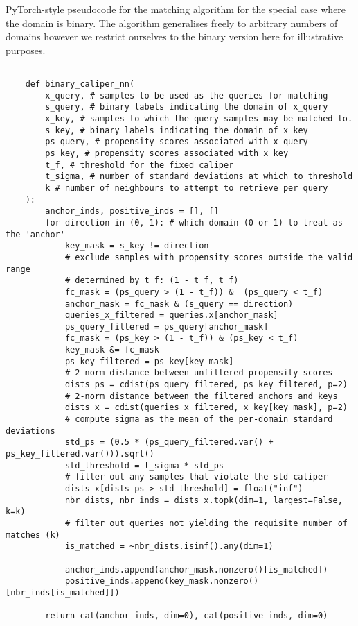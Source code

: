 \begin{algorithm}[ht]
     \caption{
         PyTorch-style pseudocode for the \CNN{} matching algorithm for the special case where the
         domain is binary. The algorithm generalises freely to arbitrary numbers of domains however
         we restrict ourselves to the binary version here for illustrative purposes.
}
    \label{alg:calipernn_pc}
    \begin{verbatim}

    def binary_caliper_nn(
        x_query, # samples to be used as the queries for matching
        s_query, # binary labels indicating the domain of x_query
        x_key, # samples to which the query samples may be matched to.
        s_key, # binary labels indicating the domain of x_key
        ps_query, # propensity scores associated with x_query
        ps_key, # propensity scores associated with x_key
        t_f, # threshold for the fixed caliper
        t_sigma, # number of standard deviations at which to threshold
        k # number of neighbours to attempt to retrieve per query
    ):
        anchor_inds, positive_inds = [], []
        for direction in (0, 1): # which domain (0 or 1) to treat as the 'anchor'
            key_mask = s_key != direction
            # exclude samples with propensity scores outside the valid range
            # determined by t_f: (1 - t_f, t_f)
            fc_mask = (ps_query > (1 - t_f)) &  (ps_query < t_f)
            anchor_mask = fc_mask & (s_query == direction)
            queries_x_filtered = queries.x[anchor_mask]
            ps_query_filtered = ps_query[anchor_mask]
            fc_mask = (ps_key > (1 - t_f)) & (ps_key < t_f)
            key_mask &= fc_mask
            ps_key_filtered = ps_key[key_mask]
            # 2-norm distance between unfiltered propensity scores
            dists_ps = cdist(ps_query_filtered, ps_key_filtered, p=2) 
            # 2-norm distance between the filtered anchors and keys
            dists_x = cdist(queries_x_filtered, x_key[key_mask], p=2)
            # compute sigma as the mean of the per-domain standard deviations
            std_ps = (0.5 * (ps_query_filtered.var() + ps_key_filtered.var())).sqrt() 
            std_threshold = t_sigma * std_ps
            # filter out any samples that violate the std-caliper
            dists_x[dists_ps > std_threshold] = float("inf")
            nbr_dists, nbr_inds = dists_x.topk(dim=1, largest=False, k=k)
            # filter out queries not yielding the requisite number of matches (k)
            is_matched = ~nbr_dists.isinf().any(dim=1)

            anchor_inds.append(anchor_mask.nonzero()[is_matched])
            positive_inds.append(key_mask.nonzero()[nbr_inds[is_matched]])

        return cat(anchor_inds, dim=0), cat(positive_inds, dim=0)

    \end{verbatim}
\end{algorithm}
